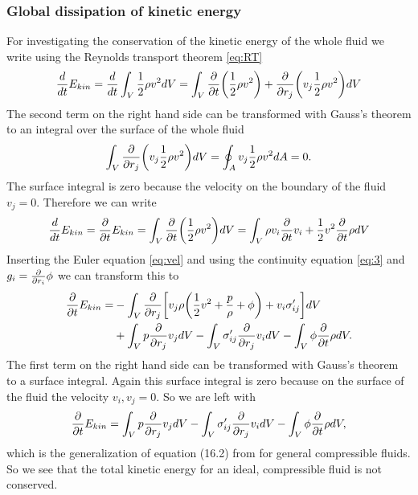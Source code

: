 \subsubsection{Global dissipation of kinetic energy}
For investigating the conservation of the kinetic energy of the
whole fluid we write using the Reynolds transport theorem \eqref{eq:RT}
\begin{align}
\frac{d}{d t} E_{kin} = \frac{d}{d t} \int_V \frac{1}{2}\rho v^2 dV = 
\int_V \frac{\partial}{\partial t} { \left( \frac{1}{2}\rho v^2 \right) } + 
\frac{\partial}{\partial r_j} { \left( v_j \frac{1}{2}\rho v^2 \right) } dV
\end{align}
The second term on the right hand side can be transformed with Gauss's theorem
to an integral over the surface of the whole fluid
\begin{align}
\int_V \frac{\partial}{\partial r_j} { \left( v_j \frac{1}{2}\rho v^2 \right) } dV = 
\oint_A v_j \frac{1}{2}\rho v^2 dA = 0.
\end{align}
The surface integral is zero because the velocity on the boundary of the fluid
$v_j = 0$. Therefore we can write
\begin{align}
\frac{d}{d t} E_{kin}=\frac{\partial}{\partial t} E_{kin}=\int_V \frac{\partial}{\partial t} { \left( \frac{1}{2}\rho v^2 \right) } dV =
\int_V \rho v_i \frac{\partial}{\partial t} v_i + \frac{1}{2} v^2 \frac{\partial}{\partial t}\rho dV 
\end{align}
Inserting the Euler equation \eqref{eq:vel} and using the continuity equation
\eqref{eq:3} and $g_i=\frac{\partial}{\partial r_i}\phi$ we can transform this to
\begin{align}
\begin{split}
\frac{\partial}{\partial t} E_{kin} =& - \int_V \frac{\partial}{\partial r_j}{ \left[ v_j \rho
{ \left( \frac{1}{2}v^2+\frac{p}{\rho}+\phi \right) } + v_i \sigma'_{ij} \right] } dV\\ 
&+ \int_V p \frac{\partial}{\partial r_j} v_j dV - \int_V \sigma'_{ij} \frac{\partial}{\partial r_j} v_i dV
- \int_V \phi \frac{\partial}{\partial t}\rho dV.
\end{split}
\end{align}
The first term on the right hand side can be transformed with Gauss's theorem
to a surface integral. Again this surface integral is zero because on the
surface of the fluid the velocity $v_i,v_j=0$. So we are left with
\begin{align}
\frac{\partial}{\partial t} E_{kin} = \int_V p \frac{\partial}{\partial r_j} v_j dV - \int_V \sigma'_{ij}
\frac{\partial}{\partial r_j} v_i dV
- \int_V \phi \frac{\partial}{\partial t}\rho dV,
\end{align}
which is the generalization of equation (16.2) from \citet{Landau1991}
for general compressible fluids. So we see that the total kinetic energy for an
ideal, compressible fluid is not conserved.  

